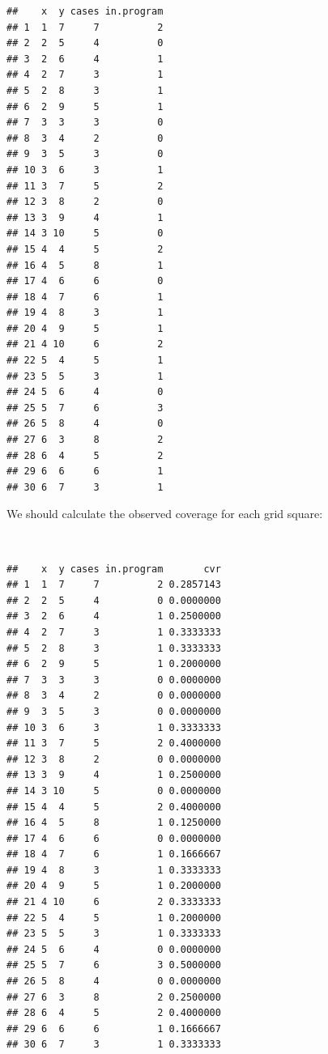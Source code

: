 \documentclass[12pt,a4paper]{book}
\newenvironment{Shaded}{\begin{snugshade}}{\end{snugshade}}
\newcommand{\NormalTok}[1]{#1}
\newcommand{\OperatorTok}[1]{\textcolor[rgb]{0.81,0.36,0.00}{\textbf{#1}}}
\newcommand{\StringTok}[1]{\textcolor[rgb]{0.31,0.60,0.02}{#1}}
\theoremstyle{definition}
\theoremstyle{definition}
\theoremstyle{definition}
\theoremstyle{remark}
\begin{document}
\begin{verbatim}
##    x  y cases in.program
## 1  1  7     7          2
## 2  2  5     4          0
## 3  2  6     4          1
## 4  2  7     3          1
## 5  2  8     3          1
## 6  2  9     5          1
## 7  3  3     3          0
## 8  3  4     2          0
## 9  3  5     3          0
## 10 3  6     3          1
## 11 3  7     5          2
## 12 3  8     2          0
## 13 3  9     4          1
## 14 3 10     5          0
## 15 4  4     5          2
## 16 4  5     8          1
## 17 4  6     6          0
## 18 4  7     6          1
## 19 4  8     3          1
## 20 4  9     5          1
## 21 4 10     6          2
## 22 5  4     5          1
## 23 5  5     3          1
## 24 5  6     4          0
## 25 5  7     6          3
## 26 5  8     4          0
## 27 6  3     8          2
## 28 6  4     5          2
## 29 6  6     6          1
## 30 6  7     3          1
\end{verbatim}

\newpage

We should calculate the observed coverage for each grid square:

~

\begin{Shaded}
\end{Shaded}

\begin{verbatim}
##    x  y cases in.program       cvr
## 1  1  7     7          2 0.2857143
## 2  2  5     4          0 0.0000000
## 3  2  6     4          1 0.2500000
## 4  2  7     3          1 0.3333333
## 5  2  8     3          1 0.3333333
## 6  2  9     5          1 0.2000000
## 7  3  3     3          0 0.0000000
## 8  3  4     2          0 0.0000000
## 9  3  5     3          0 0.0000000
## 10 3  6     3          1 0.3333333
## 11 3  7     5          2 0.4000000
## 12 3  8     2          0 0.0000000
## 13 3  9     4          1 0.2500000
## 14 3 10     5          0 0.0000000
## 15 4  4     5          2 0.4000000
## 16 4  5     8          1 0.1250000
## 17 4  6     6          0 0.0000000
## 18 4  7     6          1 0.1666667
## 19 4  8     3          1 0.3333333
## 20 4  9     5          1 0.2000000
## 21 4 10     6          2 0.3333333
## 22 5  4     5          1 0.2000000
## 23 5  5     3          1 0.3333333
## 24 5  6     4          0 0.0000000
## 25 5  7     6          3 0.5000000
## 26 5  8     4          0 0.0000000
## 27 6  3     8          2 0.2500000
## 28 6  4     5          2 0.4000000
## 29 6  6     6          1 0.1666667
## 30 6  7     3          1 0.3333333
\end{verbatim}
\end{document}
